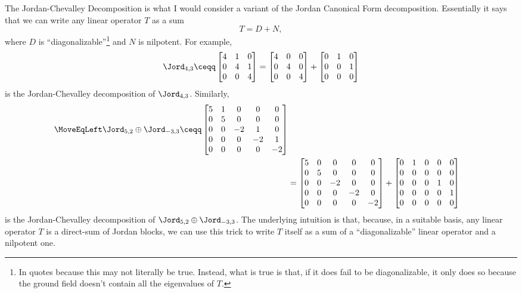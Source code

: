 The Jordan-Chevalley Decomposition is what I would consider a variant of the Jordan Canonical Form decomposition.  Essentially it says that we can write any linear operator $T$ as a sum
\begin{equation}
	T=D+N,
\end{equation}
where $D$ is ``diagonalizable''\footnote{In quotes because this may not literally be true.  Instead, what is true is that, if it does fail to be diagonalizable, it only does so because the ground field doesn't contain all the eigenvalues of $T$.} and $N$ is nilpotent.  For example,
\begin{equation}
	\Jord _{4,3}\ceqq \begin{bmatrix}4 & 1 & 0 \\ 0 & 4 & 1 \\ 0 & 0 & 4\end{bmatrix}=\begin{bmatrix}4 & 0 & 0 \\ 0 & 4 & 0 \\ 0 & 0 & 4\end{bmatrix}+\begin{bmatrix}0 & 1 & 0 \\ 0 & 0 & 1 \\ 0 & 0 & 0\end{bmatrix}
\end{equation}
is the Jordan-Chevalley decomposition of $\Jord _{4,3}$.  Similarly,
\begin{equation}
	\begin{split}
		\MoveEqLeft
		\Jord _{5,2}\oplus \Jord _{-3,3}\ceqq \begin{bmatrix}5 & 1 & 0 & 0 & 0 \\ 0 & 5 & 0 & 0 & 0 \\ 0 & 0 & -2 & 1 & 0 \\ 0 & 0 & 0 & -2 & 1 \\ 0 & 0 & 0 & 0 & -2\end{bmatrix} \\
		& =\begin{bmatrix}5 & 0 & 0 & 0 & 0 \\ 0 & 5 & 0 & 0 & 0 \\ 0 & 0 & -2 & 0 & 0 \\ 0 & 0 & 0 & -2 & 0 \\ 0 & 0 & 0 & 0 & -2\end{bmatrix}+\begin{bmatrix}0 & 1 & 0 & 0 & 0\\ 0 & 0 & 0 & 0 & 0 \\ 0 & 0 & 0 & 1 & 0 \\ 0 & 0 & 0 & 0 & 1 \\ 0 & 0 & 0 & 0 & 0\end{bmatrix}
	\end{split}
\end{equation}
is the Jordan-Chevalley decomposition of $\Jord _{5,2}\oplus \Jord _{-3,3}$.  The underlying intuition is that, because, in a suitable basis, any linear operator $T$ is a direct-sum of Jordan blocks, we can use this trick to write $T$ itself as a sum of a ``diagonalizable'' linear operator and a nilpotent one.

